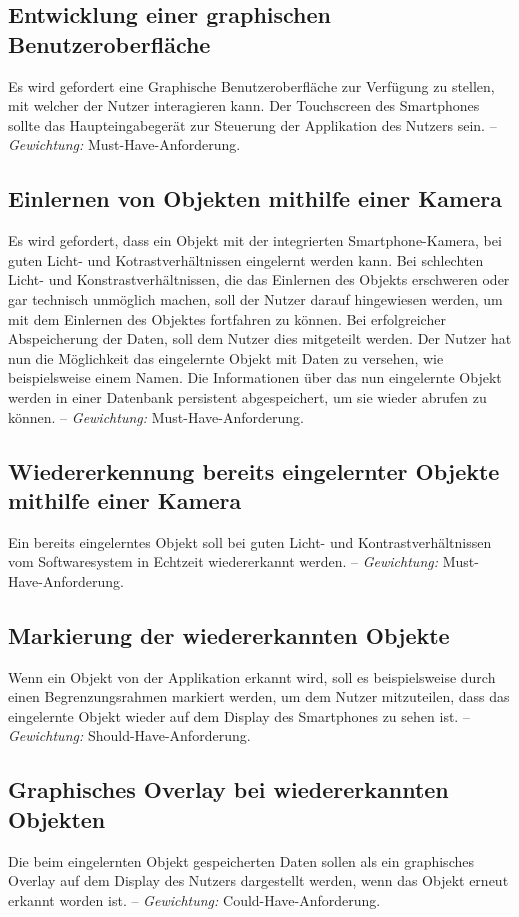 \documentclass[oneside]{ausarbeitung}
\begin{document}
\subsection{Entwicklung einer graphischen Benutzeroberfläche}
Es wird gefordert eine Graphische Benutzeroberfläche zur Verfügung zu stellen, mit welcher der Nutzer interagieren kann. Der Touchscreen des Smartphones sollte das Haupteingabegerät zur Steuerung der Applikation des Nutzers sein. -- \textit{Gewichtung:} Must-Have-Anforderung.
\subsection{Einlernen von Objekten mithilfe einer Kamera}
Es wird gefordert, dass ein Objekt mit der integrierten Smartphone-Kamera, bei guten Licht- und Kotrastverhältnissen eingelernt werden kann. Bei schlechten Licht- und Konstrastverhältnissen, die das Einlernen des Objekts erschweren oder gar technisch unmöglich machen, soll der Nutzer darauf hingewiesen werden, um mit dem Einlernen des Objektes fortfahren zu können. Bei erfolgreicher Abspeicherung der Daten, soll dem Nutzer dies mitgeteilt werden. Der Nutzer hat nun die Möglichkeit das eingelernte Objekt mit Daten zu versehen, wie beispielsweise einem Namen. Die Informationen über das nun eingelernte Objekt werden in einer Datenbank persistent abgespeichert, um sie wieder abrufen zu können. -- \textit{Gewichtung:} Must-Have-Anforderung.

\subsection{Wiedererkennung bereits eingelernter Objekte mithilfe einer Kamera}
Ein bereits eingelerntes Objekt soll bei guten Licht- und Kontrastverhältnissen vom Softwaresystem in Echtzeit wiedererkannt werden. -- \textit{Gewichtung:} Must-Have-Anforderung.

\subsection{Markierung der wiedererkannten Objekte}
Wenn ein Objekt von der Applikation erkannt wird, soll es beispielsweise durch einen Begrenzungsrahmen markiert werden, um dem Nutzer mitzuteilen, dass das eingelernte Objekt wieder auf dem Display des Smartphones zu sehen ist. -- \textit{Gewichtung:} Should-Have-Anforderung.
\subsection{Graphisches Overlay bei wiedererkannten Objekten}
Die beim eingelernten Objekt gespeicherten Daten sollen als ein graphisches Overlay auf dem Display des Nutzers dargestellt werden, wenn das Objekt erneut erkannt worden ist. -- \textit{Gewichtung:} Could-Have-Anforderung.
\end{document}
